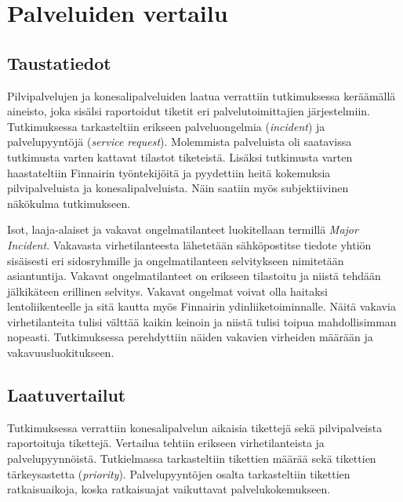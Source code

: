 \chapter{Palveluiden vertailu\label{vertailu}}
\section{Taustatiedot}
Pilvipalvelujen ja konesalipalveluiden laatua verrattiin tutkimuksessa keräämällä aineisto, joka sisälsi raportoidut tiketit eri palvelutoimittajien järjestelmiin. Tutkimuksessa tarkasteltiin erikseen palveluongelmia (\emph{incident}) ja palvelupyyntöjä (\emph{service request}). Molemmista palveluista oli saatavissa tutkimusta varten kattavat tilastot tiketeistä. Lisäksi tutkimusta varten haastateltiin Finnairin työntekijöitä ja pyydettiin heitä kokemuksia pilvipalveluista ja konesalipalveluista. Näin saatiin myös subjektiivinen näkökulma tutkimukseen.

Isot, laaja-alaiset ja vakavat ongelmatilanteet luokitellaan termillä \emph{Major Incident}. Vakavasta virhetilanteesta lähetetään sähköpostitse tiedote yhtiön sisäisesti eri sidosryhmille ja ongelmatilanteen selvitykseen nimitetään asiantuntija. Vakavat ongelmatilanteet on erikseen tilastoitu ja niistä tehdään jälkikäteen erillinen selvitys. Vakavat ongelmat voivat olla haitaksi lentoliikenteelle ja sitä kautta myös Finnairin ydinliiketoiminnalle. Näitä vakavia virhetilanteita tulisi välttää kaikin keinoin ja niistä tulisi toipua mahdollisimman nopeasti. Tutkimuksessa perehdyttiin näiden vakavien virheiden määrään ja vakavuusluokitukseen.

\section{Laatuvertailut}
Tutkimuksessa verrattiin konesalipalvelun aikaisia tikettejä sekä pilvipalveista raportoituja tikettejä. Vertailua tehtiin erikseen virhetilanteista ja palvelupyynnöistä. Tutkielmassa tarkasteltiin tikettien määrää sekä tikettien tärkeysastetta (\emph{priority}). Palvelupyyntöjen osalta tarkasteltiin tikettien ratkaisuaikoja, koska ratkaisuajat vaikuttavat palvelukokemukseen.

